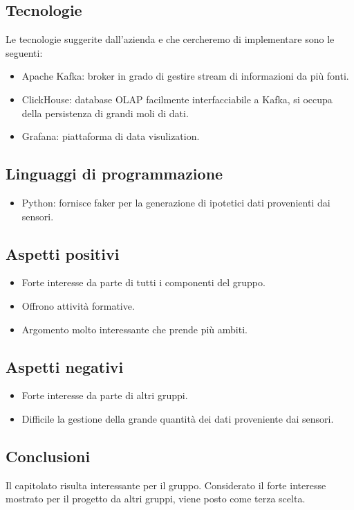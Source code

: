 \documentclass{article}
\begin{document}
\subsection{Tecnologie}
Le tecnologie suggerite dall’azienda e che cercheremo di implementare sono le seguenti:
\begin{itemize}
    \item Apache Kafka: broker in grado di gestire stream di informazioni da più fonti.
    \item ClickHouse: database OLAP facilmente interfacciabile a Kafka, si occupa della persistenza di grandi moli di dati.
     \item Grafana: piattaforma di data visulization.
\end{itemize}
\subsection{Linguaggi di programmazione}
\begin{itemize}
    \item Python: fornisce faker per la generazione di ipotetici dati provenienti dai sensori.
\end{itemize}
\subsection{Aspetti positivi}
\begin{itemize}
    \item Forte interesse da parte di tutti i componenti del gruppo.
    \item Offrono attività formative.
    \item Argomento molto interessante che prende più ambiti.
\end{itemize}
\subsection{Aspetti negativi}
\begin{itemize}
    \item Forte interesse da parte di altri gruppi.
    \item Difficile la gestione della grande quantità dei dati proveniente dai sensori.
\end{itemize}
\subsection{Conclusioni}
Il capitolato risulta interessante per il gruppo. Considerato il forte interesse mostrato per il progetto da altri gruppi, viene posto come terza scelta.
\end{document}
